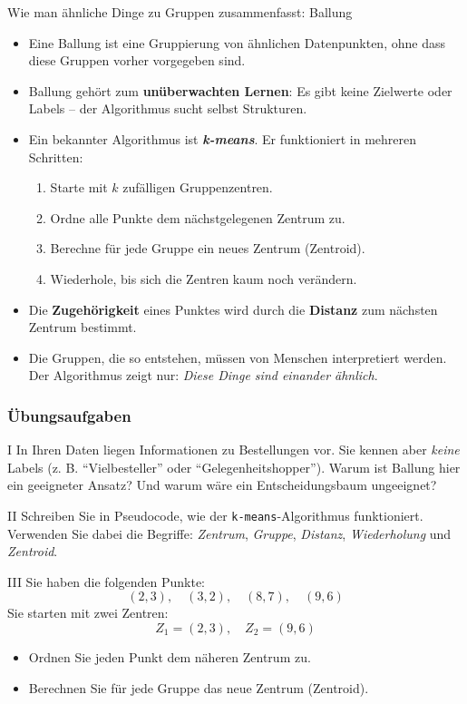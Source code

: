 \begin{lpu}{Wie man ähnliche Dinge zu Gruppen zusammenfasst: Ballung}
\begin{itemize}
  \item Eine Ballung ist eine Gruppierung von ähnlichen Datenpunkten, ohne dass diese Gruppen vorher vorgegeben sind.
  \item Ballung gehört zum \textbf{unüberwachten Lernen}: Es gibt keine Zielwerte oder Labels – der Algorithmus sucht selbst Strukturen.
  \item Ein bekannter Algorithmus ist \textbf{\textit{k-means}}. Er funktioniert in mehreren Schritten:
    \begin{enumerate}
      \item Starte mit $k$ zufälligen Gruppenzentren.
      \item Ordne alle Punkte dem nächstgelegenen Zentrum zu.
      \item Berechne für jede Gruppe ein neues Zentrum (Zentroid).
      \item Wiederhole, bis sich die Zentren kaum noch verändern.
    \end{enumerate}
  \item Die \textbf{Zugehörigkeit} eines Punktes wird durch die \textbf{Distanz} zum nächsten Zentrum bestimmt.
  \item Die Gruppen, die so entstehen, müssen von Menschen interpretiert werden. Der Algorithmus zeigt nur: \textit{Diese Dinge sind einander ähnlich}.
\end{itemize}

\subsubsection*{Übungsaufgaben}

\begin{aufgabe}{I}
In Ihren Daten liegen Informationen zu Bestellungen vor. Sie kennen aber \textit{keine} Labels (z. B. ``Vielbesteller'' oder ``Gelegenheitshopper'').  
Warum ist Ballung hier ein geeigneter Ansatz? Und warum wäre ein Entscheidungsbaum ungeeignet?
\end{aufgabe}

\begin{aufgabe}{II}
Schreiben Sie in Pseudocode, wie der \texttt{k-means}-Algorithmus funktioniert. Verwenden Sie dabei die Begriffe: \textit{Zentrum}, \textit{Gruppe}, \textit{Distanz}, \textit{Wiederholung} und \textit{Zentroid}.
\end{aufgabe}

\begin{aufgabe}{III}
Sie haben die folgenden Punkte:  
\[
(2, 3),\quad (3, 2),\quad (8, 7),\quad (9, 6)
\]  
Sie starten mit zwei Zentren:  
\[
Z_1 = (2,3),\quad Z_2 = (9,6)
\]

\begin{itemize}
  \item Ordnen Sie jeden Punkt dem näheren Zentrum zu.
  \item Berechnen Sie für jede Gruppe das neue Zentrum (Zentroid).
\end{itemize}
\end{aufgabe}


\end{lpu}


